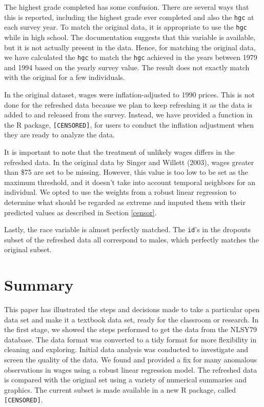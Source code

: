 \documentclass[12pt]{article}
\begin{document}
The highest grade completed has some confusion. There are several ways that this is reported, including the highest grade ever completed and also the \texttt{hgc} at each survey year. To match the original data, it is appropriate to use the \texttt{hgc} while in high school. The documentation suggests that this variable is available, but it is not actually present in the data. Hence, for matching the original data, we have calculated the \texttt{hgc} to match the \texttt{hgc} achieved in the years between 1979 and 1994 based on the yearly survey value. The result does not exactly match with the original for a few individuals.

In the original dataset, wages were inflation-adjusted to 1990 prices. This is not done for the refreshed data because we plan to keep refreshing it as the data is added to and released from the survey. Instead, we have provided a function in the R package, \texttt{[CENSORED]}, for users to conduct the inflation adjustment when they are ready to analyze the data.

It is important to note that the treatment of unlikely wages differs in the refreshed data. In the original data by Singer and Willett (2003), wages greater than \$75 are set to be missing. However, this value is too low to be set as the maximum threshold, and it doesn't take into account temporal neighbors for an individual. We opted to use the weights from a robust linear regression to determine what should be regarded as extreme and imputed them with their predicted values as described in Section \ref{censor}.

Lastly, the race variable is almost perfectly matched. The \texttt{id}'s in the dropouts subset of the refreshed data all correspond to males, which perfectly matches the original subset.

\hypertarget{summary}{%
\section{Summary}\label{summary}}

This paper has illustrated the steps and decisions made to take a particular open data set and make it a textbook data set, ready for the classroom or research. In the first stage, we showed the steps performed to get the data from the NLSY79 database. The data format was converted to a tidy format for more flexibility in cleaning and exploring. Initial data analysis was conducted to investigate and screen the quality of the data. We found and provided a fix for many anomalous observations in wages using a robust linear regression model. The refreshed data is compared with the original set using a variety of numerical summaries and graphics. The current subset is made available in a new R package, called \texttt{[CENSORED]}.
\end{document}
